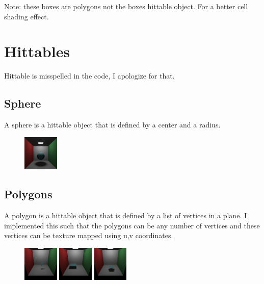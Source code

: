 \documentclass{article}
\begin{document}
        Note: these boxes are polygons not the boxes hittable object. For a better cell shading effect. \par


\section{Hittables}
    Hittable is misspelled in the code, I apologize for that. \par


    \subsection{Sphere}
    A sphere is a hittable object that is defined by a center and a radius.  \par
    \begin{figure}[h!]
        \centering
        \includegraphics[width=0.15\textwidth]{samples/LambertianSphere.png}
    \end{figure}

    \subsection{Polygons}
    A polygon is a hittable object that is defined by a list of vertices in a plane. I implemented this such that the polygons can be any number of vertices and these vertices can be texture mapped using u,v coordinates. \par

        \begin{figure}[h!]
            \centering
            \includegraphics[width=0.15\textwidth]{samples/Triangle.png}
            \includegraphics[width=0.15\textwidth]{samples/Quad.png}
            \includegraphics[width=0.15\textwidth]{samples/Pentagon.png}
        \end{figure}
\end{document}
